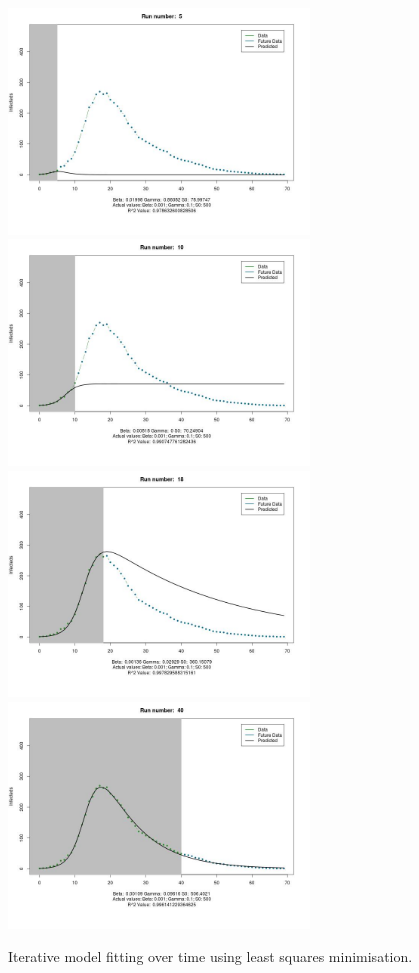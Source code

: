 \begin{centering}
\begin{figure}[h!]
  \includegraphics[width=8cm]{images/sirs0_5.jpeg}
  \includegraphics[width=8cm]{images/sirs0_10.jpeg}
  \includegraphics[width=8cm]{images/sirs0_18.jpeg}
  \includegraphics[width=8cm]{images/sirs0_40.jpeg}
\caption{Iterative model fitting over time using least squares
  minimisation.}
\label{fig:sir}
  \end{figure}
\end{centering}

